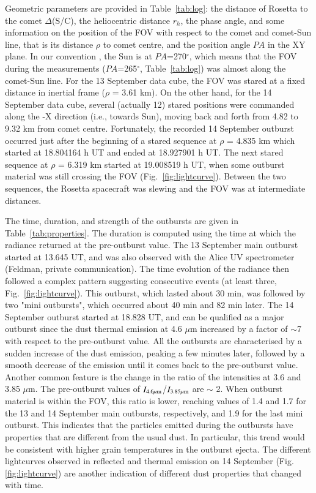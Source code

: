\documentclass[a4paper,fleqn,usenatbib]{mnras}
\begin{document}
Geometric parameters are provided in Table~\ref{tab:log}: the distance of Rosetta to the comet $\Delta$(S/C), the heliocentric distance $r_h$, the phase angle, and some information on the position of the FOV with respect to the comet and comet-Sun line, that is its distance $\rho$ to comet centre, and the position angle $PA$ in
the XY plane. In our convention \citep[see][]{dbm2016}, the Sun is at $PA$=270$^{\circ}$, which means that
the FOV during the measurements ($PA$=265$^{\circ}$, Table~\ref{tab:log}) was almost along the comet-Sun line. For the 13 September data cube,
the FOV was stared at a fixed distance in inertial frame ($\rho$ = 3.61 km). On the other hand, for the 14 September data cube, several (actually 12) stared positions were commanded along the -X direction (i.e., towards Sun), moving back and forth from 4.82 to 9.32 km from comet centre. Fortunately, the recorded 14 September outburst occurred just after the beginning of a stared sequence at $\rho$ = 4.835 km which started at 18.804164 h UT and ended at 18.927901 h UT. The next stared sequence at $\rho$ = 6.319 km started at 19.008519 h UT, when some outburst material was still crossing the FOV (Fig.~\ref{fig:lightcurve}). Between the two sequences, the Rosetta spacecraft was slewing and the FOV was at intermediate distances.

The time, duration, and strength of the outbursts are given in
Table~\ref{tab:properties}. The duration is computed using the time at which the radiance returned at the pre-outburst value. The 13 September main outburst
started at 13.645 UT, and was also observed with the Alice UV
spectrometer (Feldman, private communication).  The time evolution
of the radiance then followed a complex pattern suggesting
consecutive events (at least three, Fig.~\ref{fig:lightcurve}).
This outburst, which lasted about 30 min, was followed by two
"mini outbursts", which occurred about 40 min and 82 min later.
The 14 September outburst started at 18.828 UT, and can be
qualified as a major outburst since the dust thermal emission at
4.6 $\mu$m increased by a factor of $\sim$7 with respect to the
pre-outburst value. All the outbursts are characterised by a
sudden increase of the dust emission, peaking a few minutes later,
followed by a smooth decrease of the emission until it comes back
to the pre-outburst value. Another common feature is the change in
the ratio of the intensities at 3.6 and 3.85 $\mu$m. The
pre-outburst values of $I_{\rm 4.6\mu m}$/$I_{\rm 3.85\mu m}$ are
$\sim$ 2. When outburst material is within the FOV, this ratio is
lower, reaching values of 1.4 and 1.7 for the 13 and 14 September
main outbursts, respectively, and 1.9 for the last mini outburst.
This indicates that the particles emitted during the outbursts
have properties that are different from the usual dust. In
particular, this trend would be consistent with higher grain
temperatures in the outburst ejecta. The different lightcurves
observed in reflected and thermal emission on 14 September (Fig.~
\ref{fig:lightcurve}) are another indication of different dust
properties that changed with time.
\end{document}
